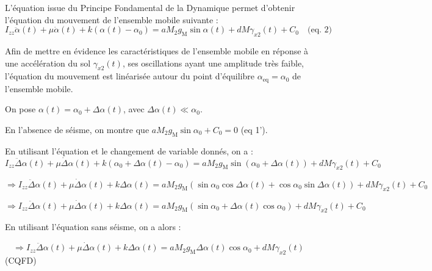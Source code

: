 L'équation issue du Principe Fondamental de la Dynamique permet d'obtenir l'équation du mouvement de l'ensemble mobile suivante :
$$I_{z z} \ddot{\alpha}(t)+\mu \dot{\alpha}(t)+k\left(\alpha(t)-\alpha_{0}\right)=a M_{2} g_{\mathrm{M}} \sin \alpha(t)+d M \gamma_{x 2}(t)+C_{0} \quad \text{(eq. 2)}
$$



Afin de mettre en évidence les caractéristiques de l'ensemble mobile en réponse à une accélération du sol $\gamma_{x 2}(t)$, ses oscillations ayant une amplitude très faible, l'équation du mouvement est linéarisée autour du point d'équilibre $\alpha_{\mathrm{eq}}=\alpha_{0}$ de l'ensemble mobile.

On pose $\alpha(t)=\alpha_{0}+\Delta \alpha(t)$, avec $\Delta \alpha(t) \ll \alpha_{0}$.


En l'absence de séisme, on montre que $a M_{2} g_{\mathrm{M}} \sin \alpha_{0}+C_{0}=0$ (eq 1').
\fi

\ifprof
\begin{corrige} 
En utilisant l'équation et le changement de variable donnés, on  a : 
$$I_{z z} \ddot{\Delta}{\alpha}(t)+\mu \dot{\Delta}{\alpha}(t)+k\left(\alpha_{0}+\Delta \alpha(t)-\alpha_{0}\right)=a M_{2} g_{\mathrm{M}} \sin \left(\alpha_{0}+\Delta \alpha(t)\right)+d M \gamma_{x 2}(t)+C_{0}
$$

$$ \Rightarrow 
I_{z z} \ddot{\Delta}{\alpha}(t)+\mu \dot{\Delta}{\alpha}(t)+k\Delta \alpha(t)=a M_{2} g_{\mathrm{M}} \left( 
\sin \alpha_{0} \cos \Delta \alpha(t) + \cos \alpha_{0} \sin \Delta \alpha(t) 
\right)
+d M \gamma_{x 2}(t)+C_{0}
$$


$$ \Rightarrow 
I_{z z} \ddot{\Delta}{\alpha}(t)+\mu \dot{\Delta}{\alpha}(t)+k\Delta \alpha(t)=a M_{2} g_{\mathrm{M}} \left( 
\sin \alpha_{0}  + \Delta \alpha(t) \cos \alpha_{0}  \right)
+d M \gamma_{x 2}(t)+C_{0}
$$

En utilisant l'équation sans séisme, on a alors : 

$$ \Rightarrow 
I_{z z} \ddot{\Delta}{\alpha}(t)+\mu \dot{\Delta}{\alpha}(t)+k\Delta \alpha(t)
=a M_{2} g_{\mathrm{M}} \Delta \alpha(t) \cos \alpha_{0} +d M \gamma_{x 2}(t)
$$
(CQFD)
\end{corrige}
\else
\fi

